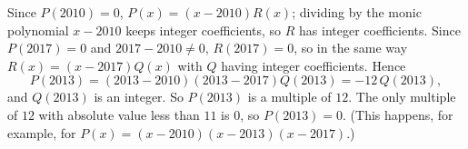 Since $P(2010)=0$, $P(x)=(x-2010)R(x)$; dividing by the monic polynomial $x-2010$ keeps integer coefficients, so $R$ has integer coefficients. Since $P(2017)=0$ and $2017-2010\ne0$, $R(2017)=0$, so in the same way $R(x)=(x-2017)Q(x)$ with $Q$ having integer coefficients. Hence
\[
P(2013)=(2013-2010)(2013-2017)Q(2013)=-12\,Q(2013),
\]
and $Q(2013)$ is an integer. So $P(2013)$ is a multiple of $12$. The only multiple of $12$ with absolute value less than $11$ is $0$, so $P(2013)=\boxed{0}$. (This happens, for example, for $P(x)=(x-2010)(x-2013)(x-2017)$.)
